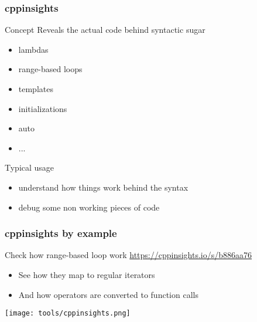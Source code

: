 \begin{frame}
  \frametitle{cppinsights}
  \begin{block}{Concept}
    Reveals the actual code behind \cpp syntactic sugar
    \begin{itemize}
    \item lambdas
    \item range-based loops
    \item templates
    \item initializations
    \item auto
    \item ...
    \end{itemize}
  \end{block}
  \begin{exampleblock}{Typical usage}
    \begin{itemize}
    \item understand how things work behind the \cpp syntax
    \item debug some non working pieces of code
    \end{itemize}
  \end{exampleblock}
\end{frame}

\begin{frame}
  \frametitle{cppinsights by example}
  \begin{block}{Check how range-based loop work}
    \url{https://cppinsights.io/s/b886aa76}
    \begin{itemize}
    \item See how they map to regular iterators
    \item And how operators are converted to function calls
    \end{itemize}
  \end{block}
  \texttt{[image: tools/cppinsights.png]}
\end{frame}
